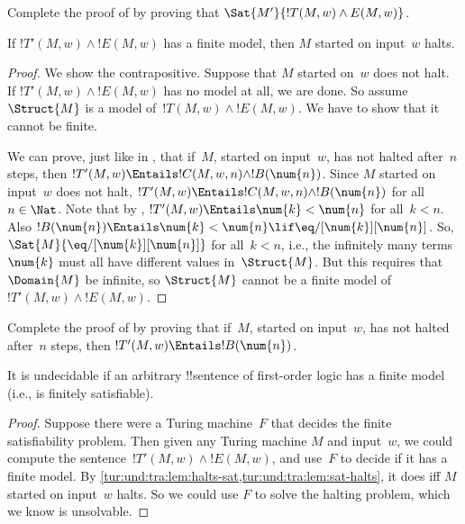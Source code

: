 \documentclass[../../../include/open-logic-section]{subfiles}
\begin{document}
\begin{prob}
  Complete the proof of  by
  proving that $\Sat{M'}{!T(M,w) \land E(M,w)}$.
\end{prob}

\begin{lem}
  If $!T'(M,w) \land !E(M,w)$ has a finite model, then $M$ started on
  input~$w$ halts.
\end{lem}

\begin{proof}
  We show the contrapositive. Suppose that $M$ started on~$w$ does not
  halt. If $!T'(M,w) \land !E(M,w)$ has no model at all, we are done.
  So assume $\Struct{M}$ is a model of~$!T(M,w) \land !E(M, w)$. We
  have to show that it cannot be finite.
  
  We can prove, just like in , that if~$M$,
  started on input~$w$, has not halted after~$n$ steps, then $!T'(M,w)
  \Entails !C(M, w, n) \land !B(\num{n})$. Since $M$ started on
  input~$w$ does not halt, $!T'(M,w) \Entails !C(M, w, n) \land
  !B(\num{n})$ for all~$n \in \Nat$. Note that by
  , $!T'(M,w) \Entails \num{k} < \num{n}$ for
  all~$k < n$. Also $!B(\num{n}) \Entails \num{k} < \num{n} \lif
  \eq/[\num{k}][\num{n}]$. So, $\Sat{M}{\eq/[\num{k}][\num{n}]}$ for
  all~$k < n$, i.e., the infinitely many terms~$\num{k}$ must all have
  different values in~$\Struct{M}$. But this requires that
  $\Domain{M}$ be infinite, so $\Struct{M}$ cannot be a finite model
  of~$!T'(M,w) \land !E(M, w)$.
\end{proof}

\begin{prob}
  Complete the proof of  by
  proving that if~$M$, started on input~$w$, has not halted after~$n$
  steps, then $!T'(M,w) \Entails !B(\num{n})$.
\end{prob}

\begin{thm}
  It is undecidable if an arbitrary !!{sentence} of first-order logic has
  a finite model (i.e., is finitely satisfiable).
\end{thm}

\begin{proof}
  Suppose there were a Turing machine~$F$ that decides the finite
  satisfiability problem. Then given any Turing machine $M$ and
  input~$w$, we could compute the sentence~$!T'(M,w) \land !E(M,w)$,
  and use~$F$ to decide if it has a finite model. By
  \cref{tur:und:tra:lem:halts-sat,tur:und:tra:lem:sat-halts}, it does iff $M$
  started on input~$w$ halts. So we could use $F$ to solve the halting
  problem, which we know is unsolvable.
\end{proof}
\end{document}
